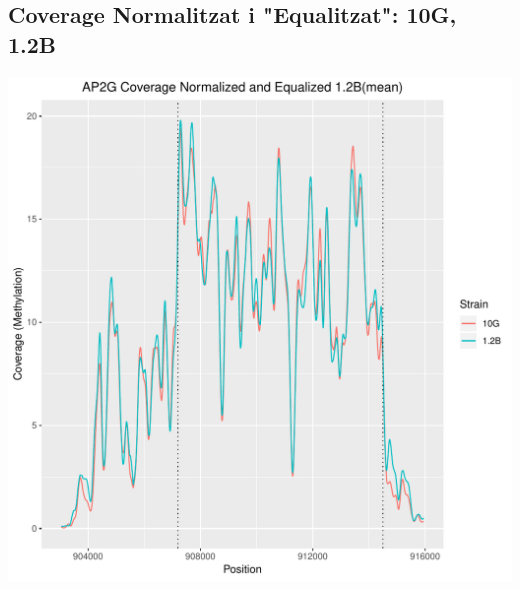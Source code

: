 \documentclass{article}\usepackage[]{graphicx}\usepackage[]{color}
\newenvironment{knitrout}{}{} %
\begin{document}
\subsection{Coverage Normalitzat i "Equalitzat": 10G, 1.2B}
\begin{knitrout}
\color{fgcolor}
\includegraphics[width=1\linewidth]{figure/plot_NromequalizedCov_10vs1_2-1} 

\end{knitrout}
\clearpage
\end{document}
